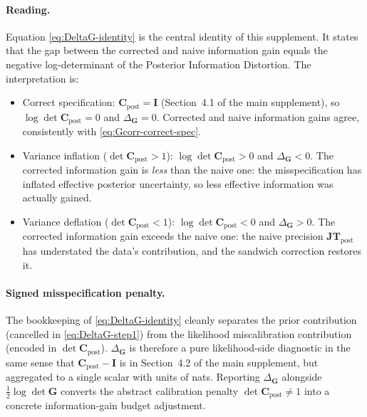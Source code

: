 \documentclass[11pt]{article}
\begin{document}
\paragraph{Reading.}
Equation \eqref{eq:DeltaG-identity} is the central identity of this supplement. It states that the gap between the corrected and naive information gain equals the negative log-determinant of the Posterior Information Distortion. The interpretation is:
\begin{itemize}
\item Correct specification: $\mathbf C_{\mathrm{post}} = \mathbf I$ (Section~4.1 of the main supplement), so $\log \det \mathbf C_{\mathrm{post}} = 0$ and $\Delta_{\mathbf G} = 0$. Corrected and naive information gains agree, consistently with \eqref{eq:Gcorr-correct-spec}.
\item Variance inflation ($\det \mathbf C_{\mathrm{post}} > 1$): $\log \det \mathbf C_{\mathrm{post}} > 0$ and $\Delta_{\mathbf G} < 0$. The corrected information gain is \emph{less} than the naive one: the misspecification has inflated effective posterior uncertainty, so less effective information was actually gained.
\item Variance deflation ($\det \mathbf C_{\mathrm{post}} < 1$): $\log \det \mathbf C_{\mathrm{post}} < 0$ and $\Delta_{\mathbf G} > 0$. The corrected information gain exceeds the naive one: the naive precision $\mathbf{JT}_{\mathrm{post}}$ has understated the data's contribution, and the sandwich correction restores it.
\end{itemize}

\paragraph{Signed misspecification penalty.}
The bookkeeping of \eqref{eq:DeltaG-identity} cleanly separates the prior contribution (cancelled in \eqref{eq:DeltaG-step1}) from the likelihood miscalibration contribution (encoded in $\det \mathbf C_{\mathrm{post}}$). $\Delta_{\mathbf G}$ is therefore a pure likelihood-side diagnostic in the same sense that $\mathbf C_{\mathrm{post}} - \mathbf I$ is in Section~4.2 of the main supplement, but aggregated to a single scalar with units of nats. Reporting $\Delta_{\mathbf G}$ alongside $\tfrac{1}{2} \log \det \mathbf G$ converts the abstract calibration penalty $\det \mathbf C_{\mathrm{post}} \neq 1$ into a concrete information-gain budget adjustment.
\end{document}
